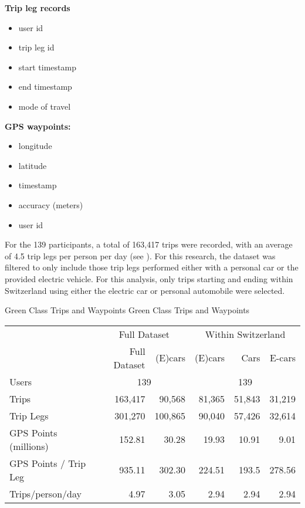 \begin{multicols}{2}
\textbf{Trip leg records}
\begin{itemize}
  \item user id
  \item trip leg id
  \item start timestamp
  \item end timestamp
  \item mode of travel
\end{itemize}

\textbf{GPS waypoints:} 
\begin{itemize}
  \item longitude
  \item latitude
  \item timestamp
  \item accuracy (meters)
  \item user id
\end{itemize}

\end{multicols}

For the 139 participants, a total of 163,417 trips were recorded, with an average of 4.5 trip legs per person per day (see ).
For this research, the dataset was filtered to only include those trip legs performed either with a personal car or the provided electric vehicle.
For this analysis, only trips starting and ending within Switzerland using either the electric car or personal automobile were selected. 


\createtable%
{Green Class Trips and Waypoints}%
{Green Class Trips and Waypoints}%
{\label{tab:green_class_gps_summary}}%
{%
\begin{tabular}{ l | r r | r r r}
                    & \multicolumn{2}{c|}{Full Dataset}  & \multicolumn{3}{c}{Within Switzerland}  \\ 
 
                    & Full Dataset  &   (E)cars & (E)cars   & Cars & E-cars \\ 
\hline
 Users            & \multicolumn{2}{c|}{139} & \multicolumn{3}{c}{139} \\  
 Trips            & 163,417       & 90,568    & 81,365    & 51,843    & 31,219\\  
 Trip Legs        & 301,270     & 100,865   & 90,040    & 57,426    & 32,614\\  
 GPS Points (millions)      &  152.81  &   30.28    &    19.93    & 10.91 & 9.01 \\ 
 GPS Points / Trip Leg &  935.11   &    302.30    &  224.51     &   193.5   &  278.56  \\  
 Trips/person/day & 4.97          & 3.05      & 2.94      & 2.94      & 2.94 \\  
\end{tabular}
}
{}



